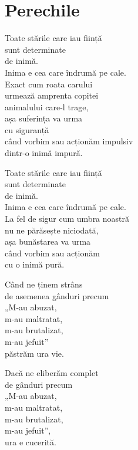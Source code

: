 
\chapter{Perechile}


Toate stările care iau ființă\\
sunt determinate\\
de inimă.\\
Inima e cea care îndrumă pe cale.\\
Exact cum roata carului\\
urmează amprenta copitei\\ \vin animalului care-l trage,\\
așa suferința va urma\\
cu siguranță\\
când vorbim sau acționăm impulsiv\\
dintr-o inimă impură.


Toate stările care iau ființă\\
sunt determinate\\
de inimă.\\
Inima e cea care îndrumă pe cale.\\
La fel de sigur cum umbra noastră\\
nu ne părăsește niciodată,\\
așa bunăstarea va urma\\
când vorbim sau acționăm\\
cu o inimă pură.


Când ne ținem strâns\\
de asemenea gânduri precum\\
„M-au abuzat,\\
m-au maltratat,\\
m-au brutalizat,\\
m-au jefuit”\\
păstrăm ura vie.


Dacă ne eliberăm complet\\
de gânduri precum\\
„M-au abuzat,\\
m-au maltratat,\\
m-au brutalizat,\\
m-au jefuit”,\\
ura e cucerită.


